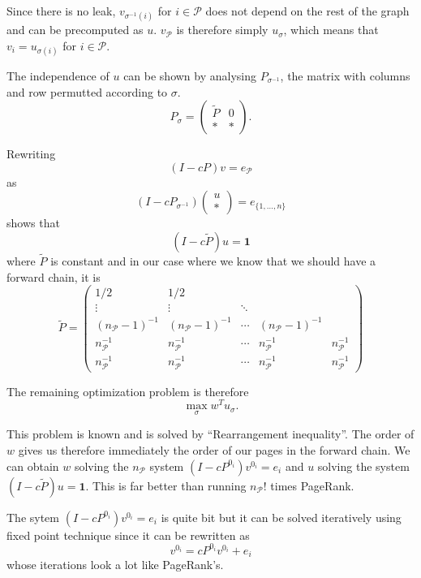 \documentclass{article}
\newcommand{\1}{\mathbf{1}}
\theoremstyle{definition}
\begin{document}
Since there is no leak, $v_{\sigma^{-1}(i)}$ for $i \in \mathcal{P}$ does not depend on the rest of the graph and can be precomputed as \(u\).
$v_\mathcal{P}$ is therefore simply $u_\sigma$, which means that $v_i = u_{\sigma(i)}$ for $i \in \mathcal{P}$.

The independence of $u$ can be shown by analysing $P_{\sigma^{-1}}$, the matrix with columns and row permutted according to $\sigma$.
\[ P_\sigma =
  \begin{pmatrix}
    \tilde{P} & 0\\
    * & *
  \end{pmatrix}.
\]

Rewriting
\[ (I - cP)v = e_\mathcal{P} \]
as
\[ (I - cP_{\sigma^{-1}})
\begin{pmatrix}
u\\
*
\end{pmatrix}
= e_{\{1,\ldots,n\}} \]
shows that
\[ (I - c\tilde{P})u = \1 \]
where $\tilde{P}$ is constant and in our case
where we know that we should have a forward chain, it is
\[
  \tilde{P} =
  \begin{pmatrix}
    1/2 & 1/2 & & &\\
    \vdots & \vdots & \ddots & &\\
    (n_\mathcal{P}-1)^{-1} & (n_\mathcal{P}-1)^{-1} & \cdots & (n_\mathcal{P}-1)^{-1} & \\
    n_\mathcal{P}^{-1} & n_\mathcal{P}^{-1} & \cdots & n_\mathcal{P}^{-1} & n_\mathcal{P}^{-1}\\
    n_\mathcal{P}^{-1} & n_\mathcal{P}^{-1} & \cdots & n_\mathcal{P}^{-1} & n_\mathcal{P}^{-1}
  \end{pmatrix}
\]

The remaining optimization problem is therefore
\[ \max_\sigma w^T u_\sigma. \]

This problem is known and is solved by ``Rearrangement inequality''.
The order of \(w\) gives us therefore immediately the order of our pages in the forward chain.
We can obtain \(w\) solving the \(n_\mathcal{P}\) system \((I - cP^{0_i})v^{0_i} = e_i\)
and \(u\) solving the system \((I - c\tilde{P})u = \1\).
This is far better than running \(n_\mathcal{P}!\) times PageRank.

The sytem \((I - cP^{0_i})v^{0_i} = e_i\) is quite bit but it can be solved iteratively using fixed point technique since
it can be rewritten as
\[ v^{0_i} = cP^{0_i}v^{0_i} + e_i \]
whose iterations look a lot like PageRank's.
\end{document}
